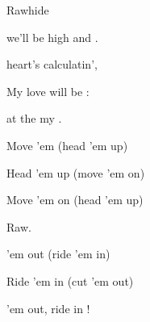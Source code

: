 \begin{SBSong}{Rawhide}
\begin{SBVerse}
     we'll be  high and .
    
     heart's calculatin',
    
    My  love will be :
    
     at the   my .
  \end{SBVerse}
  \begin{SBChorus}
    Move 'em  (head 'em up)
    
    Head 'em up (move 'em on)
    
    Move 'em on (head 'em up)
    
    Raw.
    
     'em out (ride 'em in)
    
    Ride 'em in (cut 'em out)
    
     'em out, ride  in !
  \end{SBChorus}
\end{SBSong}
